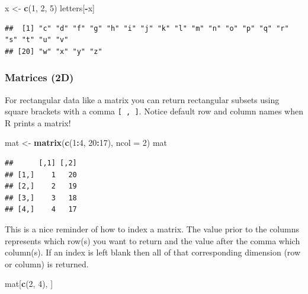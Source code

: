 \documentclass[
]{book}
\newenvironment{Shaded}{\begin{snugshade}}{\end{snugshade}}
\newcommand{\DataTypeTok}[1]{\textcolor[rgb]{0.13,0.29,0.53}{#1}}
\newcommand{\DecValTok}[1]{\textcolor[rgb]{0.00,0.00,0.81}{#1}}
\newcommand{\KeywordTok}[1]{\textcolor[rgb]{0.13,0.29,0.53}{\textbf{#1}}}
\newcommand{\NormalTok}[1]{#1}
\newcommand{\OperatorTok}[1]{\textcolor[rgb]{0.81,0.36,0.00}{\textbf{#1}}}
\newcommand{\StringTok}[1]{\textcolor[rgb]{0.31,0.60,0.02}{#1}}
\theoremstyle{definition}
\theoremstyle{definition}
\theoremstyle{definition}
\theoremstyle{remark}
\begin{document}
\begin{Shaded}
\begin{Highlighting}[]
\NormalTok{x <-}\StringTok{ }\KeywordTok{c}\NormalTok{(}\DecValTok{1}\NormalTok{, }\DecValTok{2}\NormalTok{, }\DecValTok{5}\NormalTok{)}
\NormalTok{letters[}\OperatorTok{-}\NormalTok{x]}
\end{Highlighting}
\end{Shaded}

\begin{verbatim}
##  [1] "c" "d" "f" "g" "h" "i" "j" "k" "l" "m" "n" "o" "p" "q" "r" "s" "t" "u" "v"
## [20] "w" "x" "y" "z"
\end{verbatim}

\hypertarget{matrices-2d-1}{%
\subsubsection{Matrices (2D)}\label{matrices-2d-1}}

For rectangular data like a matrix you can return rectangular subsets using square brackets with a comma \texttt{{[}\ ,\ {]}}. Notice default row and column names when R prints a matrix!

\begin{Shaded}
\begin{Highlighting}[]
\NormalTok{mat <-}\StringTok{ }\KeywordTok{matrix}\NormalTok{(}\KeywordTok{c}\NormalTok{(}\DecValTok{1}\OperatorTok{:}\DecValTok{4}\NormalTok{, }\DecValTok{20}\OperatorTok{:}\DecValTok{17}\NormalTok{), }\DataTypeTok{ncol =} \DecValTok{2}\NormalTok{)}
\NormalTok{mat}
\end{Highlighting}
\end{Shaded}

\begin{verbatim}
##      [,1] [,2]
## [1,]    1   20
## [2,]    2   19
## [3,]    3   18
## [4,]    4   17
\end{verbatim}

This is a nice reminder of how to index a matrix. The value prior to the columns represents which row(s) you want to return and the value after the comma which column(s). If an index is left blank then all of that corresponding dimension (row or column) is returned.

\begin{Shaded}
\begin{Highlighting}[]
\NormalTok{mat[}\KeywordTok{c}\NormalTok{(}\DecValTok{2}\NormalTok{, }\DecValTok{4}\NormalTok{), ]}
\end{Highlighting}
\end{Shaded}
\end{document}
